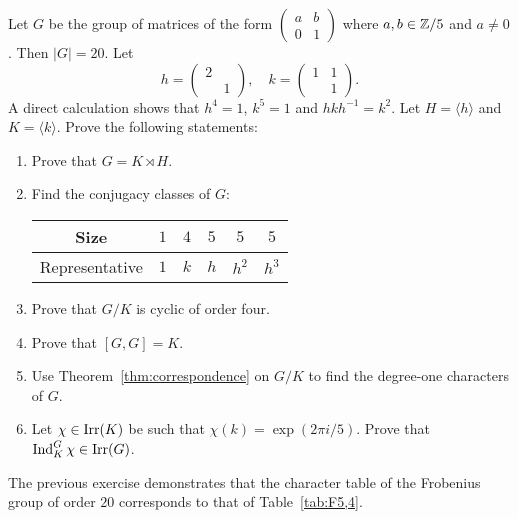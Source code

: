 \begin{exercise}
\label{xca:Frobenius_size20}
Let $G$ be the group of matrices 
of the form $\begin{pmatrix}a&b\\0&1\end{pmatrix}$ where $a,b\in\mathbb{Z}/5$ and $a\ne 0$. Then $|G|=20$. Let 
\[
    h=\begin{pmatrix}
        2\\
        &1
    \end{pmatrix},\quad 
    k=\begin{pmatrix}
        1&1\\
        &1
    \end{pmatrix}.
\]
A direct calculation shows that 
$h^4=1$, $k^5=1$ and $hkh^{-1}=k^2$. Let $H=\langle h\rangle$ 
and $K=\langle k\rangle$. Prove the following statements: 

\begin{enumerate}
    \item Prove that $G=K\rtimes H$.
    \item Find the conjugacy classes of $G$: 
\begin{center}
        \begin{tabular}{cccccc}
             Size & $1$ & $4$ & $5$ & $5$ & $5$\\
             \hline 
             Representative & $1$ & $k$ & $h$ & $h^2$ & $h^3$\\
        \end{tabular}
\end{center}
\item Prove that $G/K$ is cyclic of order four. 
\item Prove that $[G,G]=K$. 
\item Use Theorem~\ref{thm:correspondence} on $G/K$ 
    to find the degree-one characters of $G$. 
\item Let $\chi\in\operatorname{Irr}(K)$ be such that $\chi(k)=\exp(2\pi i/5)$. Prove that 
$\operatorname{Ind}_K^G\chi\in\operatorname{Irr}(G)$. 
\end{enumerate}
\end{exercise}

The previous exercise demonstrates that the character table of the 
Frobenius group of order $20$ corresponds to that of Table~\ref{tab:F5,4}.

